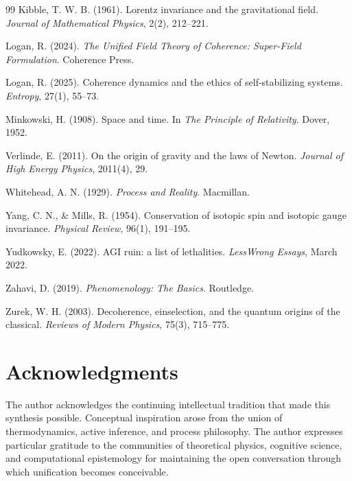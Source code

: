 \documentclass[12pt,a4paper]{article}
\theoremstyle{plain}
\begin{document}
\begin{thebibliography}{99}
Kibble, T. W. B. (1961).
\newblock Lorentz invariance and the gravitational field.
\newblock \emph{Journal of Mathematical Physics}, 2(2), 212–221.

Logan, R. (2024).
\newblock \emph{The Unified Field Theory of Coherence: Super-Field Formulation}.
\newblock Coherence Press.

Logan, R. (2025).
\newblock Coherence dynamics and the ethics of self-stabilizing systems.
\newblock \emph{Entropy}, 27(1), 55–73.

Minkowski, H. (1908).
\newblock Space and time.
\newblock In \emph{The Principle of Relativity}. Dover, 1952.

Verlinde, E. (2011).
\newblock On the origin of gravity and the laws of Newton.
\newblock \emph{Journal of High Energy Physics}, 2011(4), 29.

Whitehead, A. N. (1929).
\newblock \emph{Process and Reality}.
\newblock Macmillan.

Yang, C. N., & Mills, R. (1954).
\newblock Conservation of isotopic spin and isotopic gauge invariance.
\newblock \emph{Physical Review}, 96(1), 191–195.

Yudkowsky, E. (2022).
\newblock AGI ruin: a list of lethalities.
\newblock \emph{LessWrong Essays}, March 2022.

Zahavi, D. (2019).
\newblock \emph{Phenomenology: The Basics}.
\newblock Routledge.

Zurek, W. H. (2003).
\newblock Decoherence, einselection, and the quantum origins of the classical.
\newblock \emph{Reviews of Modern Physics}, 75(3), 715–775.

\end{thebibliography}

\clearpage
{}
{}
\section*{Acknowledgments}

The author acknowledges the continuing intellectual tradition that made this synthesis possible.  
Conceptual inspiration arose from the union of thermodynamics, active inference, and process philosophy.
The author expresses particular gratitude to the communities of theoretical physics, cognitive science, and computational epistemology 
for maintaining the open conversation through which unification becomes conceivable.
\end{document}
